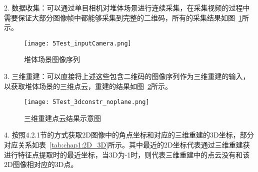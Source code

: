 2. 数据收集：可以通过单目相机对堆体场景进行连续采集，在采集视频的过程中需要保证大部分图像帧中都能够采集到完整的二维码，所有的采集结果如图~\ref{fig:5Test_inputCamera}所示。
\begin{figure}[H] %
  \centering
  \texttt{[image: 5Test\_inputCamera.png]}
  \caption{堆体场景图像序列}
  \label{fig:5Test_inputCamera}
\end{figure}
3.	三维重建：可以直接将上述这些包含二维码的图像序列作为三维重建的输入，以获取堆体场景的三维点云，重建的结果如图~\ref{fig:5Test_3dconstr_noplane}所示。
\begin{figure}[H] %
  \centering
  \texttt{[image: 5Test\_3dconstr\_noplane.png]}
  \caption{三维重建点云结果示意图}
  \label{fig:5Test_3dconstr_noplane}
  \end{figure}
4.	按照4.2.1节的方式获取2D图像中的角点坐标和对应的三维重建的3D坐标，部分对应关系如表~\ref{tab:chap1:2D_3D}所示。其中最近的2D坐标代表通过三维重建获进行特征点提取时的最近坐标，当3D为-1时，则代表三维重建中的点云没有和该2D图像相对应的3D点。
